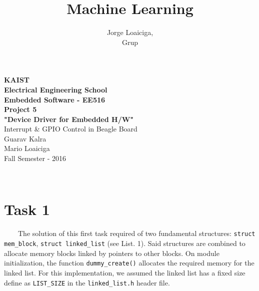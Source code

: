 \documentclass[letterpaper,12pt] {article}
\author{Jorge Loaiciga, \\{\small Grup}}
\title{{\small  Machine Learning}\\ }
\begin{document}
	\pagestyle{fancy}		%
	\chead{}
	\rhead{}
	\lfoot{}
	\cfoot{\thepage}
	\rfoot{}
	
	
	
	\setlength{\unitlength}{1 cm} %
	\thispagestyle{empty}
	\begin{center}
		\textbf{
			{\Huge KAIST}\\[0.5cm]
			{\LARGE Electrical Engineering School}\\[1.75cm]
			{\Large Embedded Software - EE516 }}\\[2.5cm]
			{\LARGE \textbf{Project 5}}\\[2cm]%
	     	{\LARGE \textbf{"Device Driver for Embedded H/W"}}\\[0.1cm]
	     	{\large Interrupt \& GPIO Control in Beagle Board }\\[2cm]
	     
	     	
	     	{\large Guarav Kalra }\\[0.5cm]
			{\large Mario Loaiciga }\\[0.5cm]
		    {\large Fall Semester - 2016 }\\[1cm] 
		
	\end{center}
	
	\newpage
	
	\setcounter{page}{1}
	\pagestyle{fancy}		%
	\chead{}
	\lfoot{}\
	
	\cfoot{\thepage}
	\rfoot{}


\section*{Task 1}
\ \ \ \ 
The solution of this first task required of two fundamental structures: \texttt{struct mem\_block}, \texttt{struct linked\_list} (see List. 1). Said structures are combined to allocate memory blocks linked by pointers to other blocks. On module initialization, the function \texttt{dummy\_create()} allocates the required memory for the linked list. For this implementation, we assumed the linked list has a fixed size define as \texttt{LIST\_SIZE} in the \texttt{linked\_list.h} header file. \\
\end{document}
